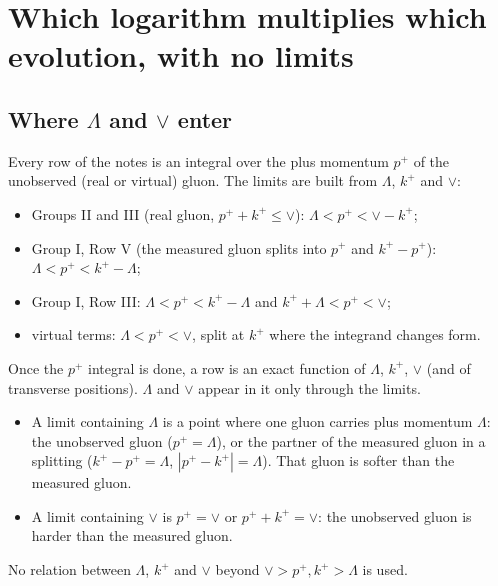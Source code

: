 \documentclass[10pt]{article}
\numberwithin{equation}{section}
\begin{document}
\section{Which logarithm multiplies which evolution, with no limits}\label{sec:which}

\subsection{Where \texorpdfstring{$\Lambda$}{Lambda} and \texorpdfstring{$\vee$}{vee} enter}\label{sec:enter}
Every row of the notes is an integral over the plus momentum $p^+$ of the unobserved (real or virtual) gluon. The limits are built from $\Lambda$, $k^+$ and $\vee$:
\begin{itemize}
\item Groups II and III (real gluon, $p^++k^+\le\vee$): $\Lambda<p^+<\vee-k^+$;
\item Group I, Row V (the measured gluon splits into $p^+$ and $k^+-p^+$): $\Lambda<p^+<k^+-\Lambda$;
\item Group I, Row III: $\Lambda<p^+<k^+-\Lambda$ and $k^++\Lambda<p^+<\vee$;
\item virtual terms: $\Lambda<p^+<\vee$, split at $k^+$ where the integrand changes form.
\end{itemize}
Once the $p^+$ integral is done, a row is an exact function of $\Lambda$, $k^+$, $\vee$ (and of transverse positions). $\Lambda$ and $\vee$ appear in it only through the limits.
\begin{itemize}
\item A limit containing $\Lambda$ is a point where one gluon carries plus momentum $\Lambda$: the unobserved gluon ($p^+=\Lambda$), or the partner of the measured gluon in a splitting ($k^+-p^+=\Lambda$, $|p^+-k^+|=\Lambda$). That gluon is softer than the measured gluon.
\item A limit containing $\vee$ is $p^+=\vee$ or $p^++k^+=\vee$: the unobserved gluon is harder than the measured gluon.
\end{itemize}
No relation between $\Lambda$, $k^+$ and $\vee$ beyond $\vee>p^+,k^+>\Lambda$ is used.
\end{document}
